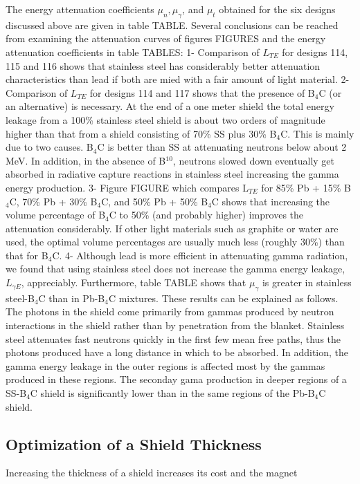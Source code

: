 \documentclass[11pt]{report} %
\begin{document}
The energy attenuation coefficients $\mu_n,\mu_{\gamma}$, and $\mu_t$ obtained for the six designs discussed above are given in table TABLE. Several conclusions can be reached from examining the attenuation curves of figures FIGURES and the energy attenuation coefficients in table TABLES: 1- Comparison of $L_{TE}$ for designs 114, 115 and 116 shows that stainless steel has considerably better attenuation characteristics than lead if both are mied with a fair amount of light material. 2- Comparison of $L_{TE}$ for designs 114 and 117 shows that the presence of B$_4$C (or an alternative) is necessary. At the end of a one meter shield the total energy leakage from a 100\% stainless steel shield is about two orders of magnitude higher than that from a shield consisting of 70\% SS plus 30\% B$_4$C. This is mainly due to two causes. B$_4$C is better than SS at attenuating neutrons below about 2 MeV. In addition, in the absence of B$^{10}$, neutrons slowed down eventually get absorbed in radiative capture reactions in stainless steel increasing the gamma energy production. 3- Figure FIGURE which compares L$_{TE}$ for 85\% Pb + 15\% B$_4$C, 70\% Pb + 30\% B$_4$C, and 50\% Pb + 50\% B$_4$C shows that increasing the volume percentage of B$_4$C to 50\% (and probably higher) improves the attenuation considerably. If other light materials such as graphite or water are used, the optimal volume percentages are usually much less (roughly 30\%) than that for B$_4$C. 4- Although lead is more efficient in attenuating gamma radiation, we found that using stainless steel does not increase the gamma energy leakage, $L_{\gamma E}$, appreciably. Furthermore, table TABLE shows that $\mu_{\gamma}$ is greater in stainless steel-B$_4$C than in Pb-B$_4$C mixtures. These results can be explained as follows. The photons in the shield come primarily from gammas produced by neutron interactions in the shield rather than by penetration from the blanket. Stainless steel attenuates fast neutrons quickly in the first few mean free paths, thus the photons produced have a long distance in which to be absorbed. In addition, the gamma energy leakage in the outer regions is affected most by the gammas produced in these regions. The seconday gama production in deeper regions of a SS-B$_4$C shield is significantly lower than in the same regions of the Pb-B$_4$C shield.

\subsection{Optimization of a Shield Thickness}
Increasing the thickness of a shield increases its cost and the magnet
\end{document}

